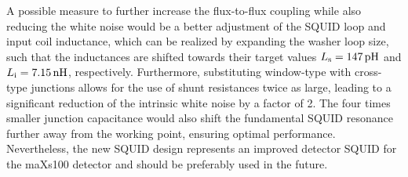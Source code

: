 A possible measure to further increase the flux-to-flux coupling while also reducing the white noise would be a better adjustment of the SQUID loop and input coil inductance, which can be realized by expanding the washer loop size, such that the inductances are shifted towards their target values $L_{\rm s}=\qty{147}{\pH}$ and $L_{\rm i}=\qty{7.15}{\nH}$, respectively. Furthermore, substituting window-type with cross-type junctions allows for the use of shunt resistances twice as large, leading to a significant reduction of the intrinsic white noise by a factor of 2. The four times smaller junction capacitance would also shift the fundamental SQUID resonance further away from the working point, ensuring optimal performance. Nevertheless, the new SQUID design represents an improved detector SQUID for the maXs100 detector and should be preferably used in the future. 
